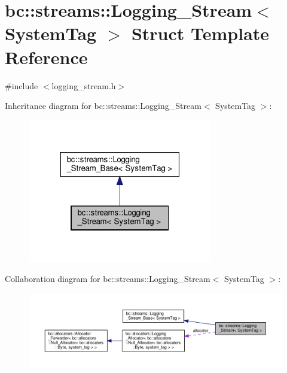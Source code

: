 \hypertarget{structbc_1_1streams_1_1Logging__Stream}{}\section{bc\+:\+:streams\+:\+:Logging\+\_\+\+Stream$<$ System\+Tag $>$ Struct Template Reference}
\label{structbc_1_1streams_1_1Logging__Stream}


{\ttfamily \#include $<$logging\+\_\+stream.\+h$>$}



Inheritance diagram for bc\+:\+:streams\+:\+:Logging\+\_\+\+Stream$<$ System\+Tag $>$\+:\nopagebreak
\begin{figure}[H]
\begin{center}
\leavevmode
\includegraphics[width=229pt]{structbc_1_1streams_1_1Logging__Stream__inherit__graph}
\end{center}
\end{figure}


Collaboration diagram for bc\+:\+:streams\+:\+:Logging\+\_\+\+Stream$<$ System\+Tag $>$\+:\nopagebreak
\begin{figure}[H]
\begin{center}
\leavevmode
\includegraphics[width=350pt]{structbc_1_1streams_1_1Logging__Stream__coll__graph}
\end{center}
\end{figure}
